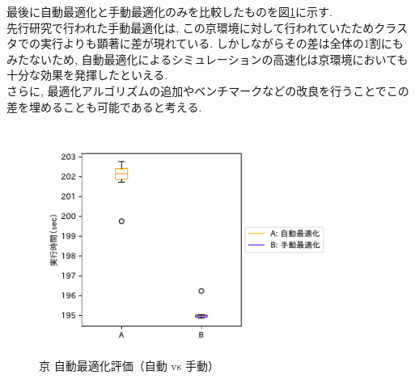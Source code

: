 最後に自動最適化と手動最適化のみを比較したものを図\ref{fig:k-compare-2}に示す.\\
先行研究で行われた手動最適化は, この京環境に対して行われていたためクラスタでの実行よりも顕著に差が現れている.
しかしながらその差は全体の1割にもみたないため, 自動最適化によるシミュレーションの高速化は京環境においても十分な効果を発揮したといえる.\\
さらに, 最適化アルゴリズムの追加やベンチマークなどの改良を行うことでこの差を埋めることも可能であると考える.\\
\begin{figure}[htb]
 \begin{center}
    \includegraphics[width=14cm]{./images/k-compare-2.pdf}
    \caption{京 自動最適化評価（自動 vs 手動）}
    \label{fig:k-compare-2}
  \end{center}
\end{figure}~\\
